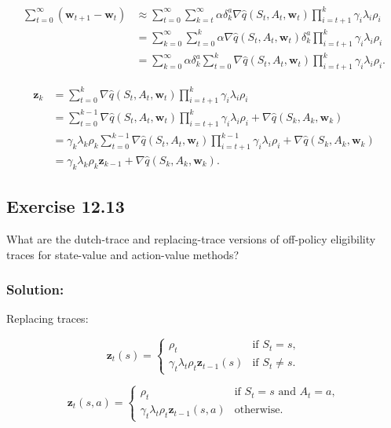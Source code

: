 \begin{align*}
    \sum_{t=0}^{\infty} (\mathbf{w}_{t+1} - \mathbf{w}_t) &\approx \sum_{t=0}^{\infty} \sum_{k=t}^{\infty} \alpha \delta_k^a \nabla \hat{q}(S_t, A_t, \mathbf{w}_t) \prod_{i=t+1}^{k} \gamma_i \lambda_i \rho_i \\
    &= \sum_{k=0}^{\infty} \sum_{t=0}^{k} \alpha  \nabla \hat{q}(S_t, A_t, \mathbf{w}_t) \delta_k^a \prod_{i=t+1}^{k} \gamma_i \lambda_i \rho_i \\
    &= \sum_{k=0}^{\infty} \alpha \delta_k^a \sum_{t=0}^{k}  \nabla \hat{q}(S_t, A_t, \mathbf{w}_t) \prod_{i=t+1}^{k} \gamma_i \lambda_i \rho_i.
\end{align*}

\begin{align*}
    \mathbf{z}_k &= \sum_{t=0}^{k}  \nabla \hat{q}(S_t, A_t, \mathbf{w}_t) \prod_{i=t+1}^{k} \gamma_i \lambda_i \rho_i \\
    &= \sum_{t=0}^{k-1}  \nabla \hat{q}(S_t, A_t, \mathbf{w}_t) \prod_{i=t+1}^{k} \gamma_i \lambda_i \rho_i + \nabla \hat{q}(S_k, A_k, \mathbf{w}_k) \\
    &= \gamma_k \lambda_k \rho_k \sum_{t=0}^{k-1}  \nabla \hat{q}(S_t, A_t, \mathbf{w}_t) \prod_{i=t+1}^{k-1} \gamma_i \lambda_i \rho_i +  \nabla \hat{q}(S_k, A_k, \mathbf{w}_k) \\
    &= \gamma_k \lambda_k \rho_k \mathbf{z}_{k-1} + \nabla \hat{q}(S_k, A_k, \mathbf{w}_k).
\end{align*}

\subsection*{Exercise 12.13}
What are the dutch-trace and replacing-trace versions of off-policy
eligibility traces for state-value and action-value methods?

\subsubsection*{Solution:}

Replacing traces:

\[
    \mathbf{z}_t(s) = \begin{cases} 
\rho_t & \text{if } S_t = s, \\
\gamma_t \lambda_t \rho_t \mathbf{z}_{t-1}(s) & \text{if } S_t \neq s.
\end{cases}
\]

\[
    \mathbf{z}_t(s, a) = \begin{cases} 
\rho_t & \text{if } S_t = s \text{ and } A_t = a, \\
\gamma_t \lambda_t \rho_t \mathbf{z}_{t-1}(s, a) & \text{otherwise}.
\end{cases}
\]

